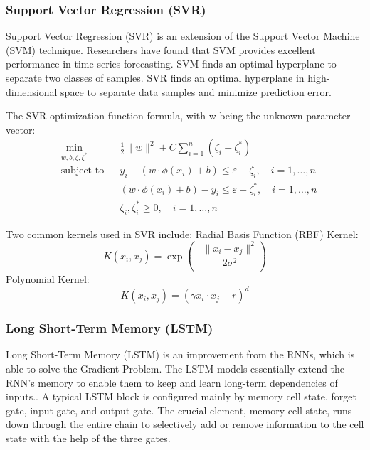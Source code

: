 \documentclass{ieeeojies}
\begin{document}
\subsubsection{\textbf{Support Vector Regression (SVR)}}
\hspace{1em}Support Vector Regression (SVR) is an extension of the Support Vector Machine (SVM) technique. Researchers have found that SVM provides excellent performance in time series forecasting. SVM finds an optimal hyperplane to separate two classes of samples. SVR finds an optimal hyperplane in high-dimensional space to separate data samples and minimize prediction error.

The SVR optimization function formula, with w being the unknown parameter vector: \cite{a11}
\begin{equation}
\begin{aligned}
& \underset{w, b, \zeta, \zeta^*}{\text{min}}
& & \frac{1}{2} \|w\|^2 + C \sum_{i=1}^{n} (\zeta_i + \zeta_i^*) \\
& \text{subject to}
& & y_i - (w \cdot \phi(x_i) + b) \leq \varepsilon + \zeta_i, \quad i = 1, \ldots, n \\
& & & (w \cdot \phi(x_i) + b) - y_i \leq \varepsilon + \zeta_i^*, \quad i = 1, \ldots, n \\
& & & \zeta_i, \zeta_i^* \geq 0, \quad i = 1, \ldots, n
\end{aligned}
\end{equation}

Two common kernels used in SVR include:
Radial Basis Function (RBF) Kernel:
\[K(x_i, x_j) = \exp\left(-\frac{\|x_i - x_j\|^2}{2\sigma^2}\right)\]
Polynomial Kernel:
\[K(x_i, x_j) = (\gamma x_i \cdot x_j + r)^d\]

\subsubsection{\textbf{Long Short-Term Memory (LSTM)}}
\hspace{1em}Long Short-Term Memory (LSTM) is an improvement from the RNNs, which is able to solve the Gradient Problem. The LSTM models essentially extend the RNN's memory to enable them to keep and learn long-term dependencies of inputs.\cite{a12}. A typical LSTM block is configured mainly by memory cell state, forget gate, input gate, and output gate. The crucial element, memory cell state, runs down through the entire chain to selectively add or remove information to the cell state with the help of the three gates.\cite{a13}
\end{document}

